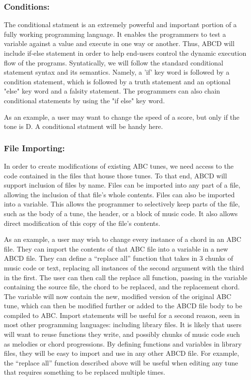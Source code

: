     \subsubsection{Conditions:}
        The conditional statment is an extremely powerful and important portion of a fully working programming language. It enables the programmers to test a variable against a value and execute in one way or another. Thus, ABCD will include if-else statement in order to help end-users control the dynamic execution flow of the programs. Syntatically, we will follow the standard conditional statement syntax and its semantics. Namely, a 'if' key word is followed by a condition statement, which is followed by a truth statement and an optional "else" key word and a falsity statement. The programmers can also chain conditional statements by using the "if else" key word.

        As an example, a user may want to change the speed of a score, but only if the tone is D. A conditional statment will be handy here.

    \subsubsection{File Importing:}
    In order to create modifications of existing ABC tunes, we need access to the code contained in the files that house those tunes. To that end, ABCD will support inclusion of files by name. Files can be imported into any part of a file, allowing the inclusion of that file's whole contents. Files can also be imported into a variable. This allows the programmer to selectively keep parts of the file, such as the body of a tune, the header, or a block of music code. It also allows direct modification of this copy of the file's contents. 
    
    As an example, a user may wish to change every instance of a chord in an ABC file. They can import the contents of that ABC file into a variable in a new ABCD file. They can define a “replace all” function that takes in 3 chunks of music code or text, replacing all instances of the second argument with the third in the first. The user can then call the replace all function, passing in the variable containing the source file, the chord to be replaced, and the replacement chord. The variable will now contain the new, modified version of the original ABC tune, which can then be modified further or added to the ABCD file body to be compiled to ABC.
    Import statements will be useful for a second reason, seen in most other programming languages: including library files. It is likely that users will want to reuse functions they write, and possibly chunks of music code such as melodies or chord progressions. By defining functions and variables in library files, they will be easy to import and use in any other ABCD file. For example, the “replace all” function described above will be useful when editing any tune that requires something to be replaced multiple times.
    
